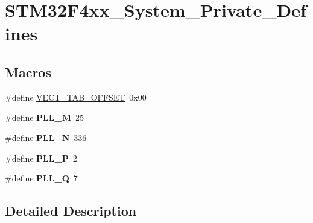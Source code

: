 \hypertarget{group___s_t_m32_f4xx___system___private___defines}{\section{S\-T\-M32\-F4xx\-\_\-\-System\-\_\-\-Private\-\_\-\-Defines}
\label{group___s_t_m32_f4xx___system___private___defines}
}
\subsection*{Macros}
\begin{DoxyCompactItemize}
\item 
\#define \hyperlink{group___s_t_m32_f4xx___system___private___defines_ga40e1495541cbb4acbe3f1819bd87a9fe}{V\-E\-C\-T\-\_\-\-T\-A\-B\-\_\-\-O\-F\-F\-S\-E\-T}~0x00
\item 
\hypertarget{group___s_t_m32_f4xx___system___private___defines_ga0fa5a868f5cd056a04b1c42e454b9617}{\#define {\bfseries P\-L\-L\-\_\-\-M}~25}\label{group___s_t_m32_f4xx___system___private___defines_ga0fa5a868f5cd056a04b1c42e454b9617}

\item 
\hypertarget{group___s_t_m32_f4xx___system___private___defines_ga04586ea638d21afe558db4f2798c38a6}{\#define {\bfseries P\-L\-L\-\_\-\-N}~336}\label{group___s_t_m32_f4xx___system___private___defines_ga04586ea638d21afe558db4f2798c38a6}

\item 
\hypertarget{group___s_t_m32_f4xx___system___private___defines_ga290dcd27167e925d817e8334111c1c01}{\#define {\bfseries P\-L\-L\-\_\-\-P}~2}\label{group___s_t_m32_f4xx___system___private___defines_ga290dcd27167e925d817e8334111c1c01}

\item 
\hypertarget{group___s_t_m32_f4xx___system___private___defines_gac958257ddb2537c539cffdb3a4543067}{\#define {\bfseries P\-L\-L\-\_\-\-Q}~7}\label{group___s_t_m32_f4xx___system___private___defines_gac958257ddb2537c539cffdb3a4543067}

\end{DoxyCompactItemize}


\subsection{Detailed Description}


